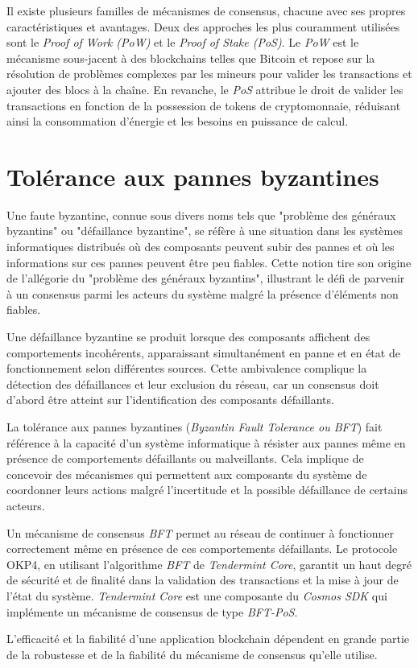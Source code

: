Il existe plusieurs familles de mécanismes de consensus, chacune avec ses propres caractéristiques et avantages. Deux des approches les plus couramment utilisées sont le \textit{Proof of Work (PoW)} et le \textit{Proof of Stake (PoS)}. Le \textit{PoW} est le mécanisme sous-jacent à des blockchains telles que Bitcoin et repose sur la résolution de problèmes complexes par les mineurs pour valider les transactions et ajouter des blocs à la chaîne. En revanche, le \textit{PoS} attribue le droit de valider les transactions en fonction de la possession de tokens de cryptomonnaie, réduisant ainsi la consommation d'énergie et les besoins en puissance de calcul.

\section{Tolérance aux pannes byzantines} \label{ansec:bft}

Une faute byzantine, connue sous divers noms tels que "problème des généraux byzantins" ou "défaillance byzantine", se réfère à une situation dans les systèmes informatiques distribués où des composants peuvent subir des pannes et où les informations sur ces pannes peuvent être peu fiables. Cette notion tire son origine de l'allégorie du "problème des généraux byzantins", illustrant le défi de parvenir à un consensus parmi les acteurs du système malgré la présence d'éléments non fiables.

Une défaillance byzantine se produit lorsque des composants affichent des comportements incohérents, apparaissant simultanément en panne et en état de fonctionnement selon différentes sources. Cette ambivalence complique la détection des défaillances et leur exclusion du réseau, car un consensus doit d'abord être atteint sur l'identification des composants défaillants.

La tolérance aux pannes byzantines (\textit{Byzantin Fault Tolerance ou BFT}) fait référence à la capacité d'un système informatique à résister aux pannes même en présence de comportements défaillants ou malveillants. Cela implique de concevoir des mécanismes qui permettent aux composants du système de coordonner leurs actions malgré l'incertitude et la possible défaillance de certains acteurs.

Un mécanisme de consensus \textit{BFT} permet au réseau de continuer à fonctionner correctement même en présence de ces comportements défaillants. Le protocole OKP4, en utilisant l'algorithme \textit{BFT} de \textit{Tendermint Core}, garantit un haut degré de sécurité et de finalité dans la validation des transactions et la mise à jour de l'état du système. \textit{Tendermint Core} est une composante du \textit{Cosmos SDK} qui implémente un mécanisme de consensus de type \textit{BFT-PoS}.

L'efficacité et la fiabilité d'une application blockchain dépendent en grande partie de la robustesse et de la fiabilité du mécanisme de consensus qu'elle utilise.